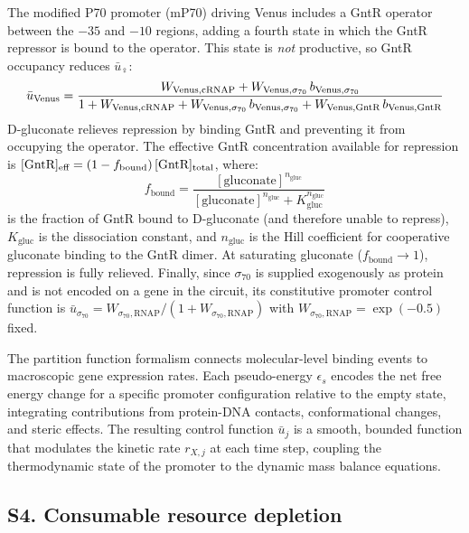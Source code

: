 The modified P70 promoter (mP70) driving Venus includes a GntR operator between the $-35$ and $-10$ regions, adding a fourth state in which the GntR repressor is bound to the operator. This state is \textit{not} productive, so GntR occupancy reduces $\bar{u}_{\Venus}$:
\begin{equation}
\bar{u}_{\text{Venus}} = \frac{W_{\text{Venus},\text{cRNAP}} + W_{\text{Venus},\sigma_{70}}\,b_{\text{Venus},\sigma_{70}}}{1 + W_{\text{Venus},\text{cRNAP}} + W_{\text{Venus},\sigma_{70}}\,b_{\text{Venus},\sigma_{70}} + W_{\text{Venus},\text{GntR}}\,b_{\text{Venus},\text{GntR}}}
\label{eq:u_Venus}
\end{equation}
D-gluconate relieves repression by binding GntR and preventing it from occupying the operator. The effective GntR concentration available for repression is $[\text{GntR}]_{\text{eff}} = (1 - f_{\text{bound}})\,[\text{GntR}]_{\text{total}}$, where:
\begin{equation}
f_{\text{bound}} = \frac{[\text{gluconate}]^{n_{\text{gluc}}}}{[\text{gluconate}]^{n_{\text{gluc}}} + K_{\text{gluc}}^{n_{\text{gluc}}}}
\label{eq:gluconate_binding}
\end{equation}
is the fraction of GntR bound to D-gluconate (and therefore unable to repress), $K_{\text{gluc}}$ is the dissociation constant, and $n_{\text{gluc}}$ is the Hill coefficient for cooperative gluconate binding to the GntR dimer. At saturating gluconate ($f_{\text{bound}} \to 1$), repression is fully relieved. Finally, since $\sigma_{70}$ is supplied exogenously as protein and is not encoded on a gene in the circuit, its constitutive promoter control function is $\bar{u}_{\sigma_{70}} = W_{\sigma_{70},\text{RNAP}}/(1 + W_{\sigma_{70},\text{RNAP}})$ with $W_{\sigma_{70},\text{RNAP}} = \exp(-0.5)$ fixed.

The partition function formalism connects molecular-level binding events to macroscopic gene expression rates. Each pseudo-energy $\epsilon_s$ encodes the net free energy change for a specific promoter configuration relative to the empty state, integrating contributions from protein-DNA contacts, conformational changes, and steric effects. The resulting control function $\bar{u}_j$ is a smooth, bounded function that modulates the kinetic rate $r_{X,j}$ at each time step, coupling the thermodynamic state of the promoter to the dynamic mass balance equations.

\subsection*{S4. Consumable resource depletion}

